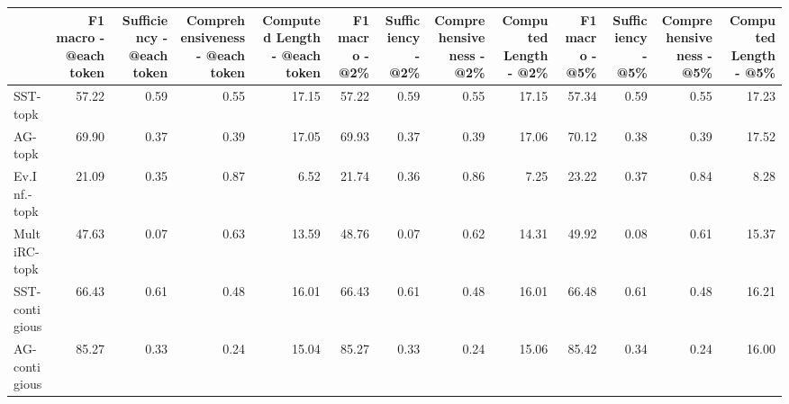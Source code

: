 \begin{tabular}{lrrrrrrrrrrrr}
\toprule
{} &  F1 macro - @each token &  Sufficiency - @each token &  Comprehensiveness - @each token &  Computed Length - @each token &  F1 macro - @2\% &  Sufficiency - @2\% &  Comprehensiveness - @2\% &  Computed Length - @2\% &  F1 macro - @5\% &  Sufficiency - @5\% &  Comprehensiveness - @5\% &  Computed Length - @5\% \\
\midrule
SST-topk           &                   57.22 &                       0.59 &                             0.55 &                          17.15 &           57.22 &               0.59 &                     0.55 &                  17.15 &           57.34 &               0.59 &                     0.55 &                  17.23 \\
AG-topk            &                   69.90 &                       0.37 &                             0.39 &                          17.05 &           69.93 &               0.37 &                     0.39 &                  17.06 &           70.12 &               0.38 &                     0.39 &                  17.52 \\
Ev.Inf.-topk       &                   21.09 &                       0.35 &                             0.87 &                           6.52 &           21.74 &               0.36 &                     0.86 &                   7.25 &           23.22 &               0.37 &                     0.84 &                   8.28 \\
MultiRC-topk       &                   47.63 &                       0.07 &                             0.63 &                          13.59 &           48.76 &               0.07 &                     0.62 &                  14.31 &           49.92 &               0.08 &                     0.61 &                  15.37 \\
SST-contigious     &                   66.43 &                       0.61 &                             0.48 &                          16.01 &           66.43 &               0.61 &                     0.48 &                  16.01 &           66.48 &               0.61 &                     0.48 &                  16.21 \\
AG-contigious      &                   85.27 &                       0.33 &                             0.24 &                          15.04 &           85.27 &               0.33 &                     0.24 &                  15.06 &           85.42 &               0.34 &                     0.24 &                  16.00 \\

\end{tabular}
